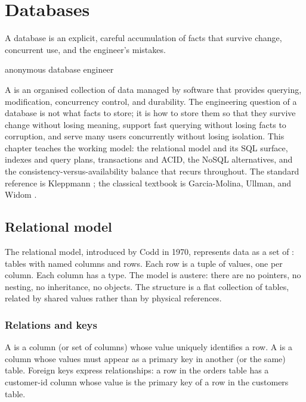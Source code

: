 \chapter{Databases}
\label{vol07:ch09}

\epigraph{A database is an explicit, careful accumulation of facts that survive change, concurrent use, and the engineer's mistakes.}{anonymous database engineer}


\noindent
A  is an organised collection of data managed by software that provides querying, modification, concurrency control, and durability. The engineering question of a database is not what facts to store; it is how to store them so that they survive change without losing meaning, support fast querying without losing facts to corruption, and serve many users concurrently without losing isolation. This chapter teaches the working model: the relational model and its SQL surface, indexes and query plans, transactions and ACID, the NoSQL alternatives, and the consistency-versus-availability balance that recurs throughout. The standard reference is Kleppmann \cite{text:kleppmann-ddia}; the classical textbook is Garcia-Molina, Ullman, and Widom \cite{text:garcia-molina-ullman-widom}.

\section{Relational model}

The relational model, introduced by Codd in 1970, represents data as a set of : tables with named columns and rows. Each row is a tuple of values, one per column. Each column has a type. The model is austere: there are no pointers, no nesting, no inheritance, no objects. The structure is a flat collection of tables, related by shared values rather than by physical references.

\subsection{Relations and keys}

A  is a column (or set of columns) whose value uniquely identifies a row. A  is a column whose values must appear as a primary key in another (or the same) table. Foreign keys express relationships: a row in the orders table has a customer-id column whose value is the primary key of a row in the customers table.

